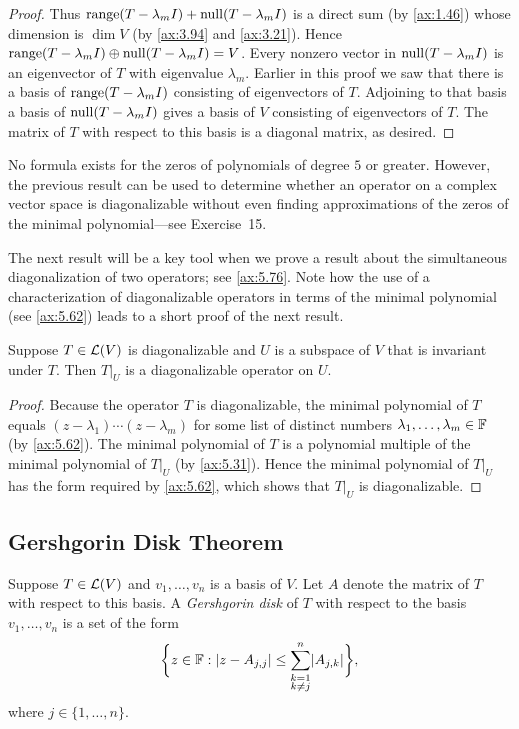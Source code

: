 \begin{proof}
Thus $\operatorname{range}(T-\lambda_mI)+\operatorname{null}(T-\lambda_mI)$ is a direct sum (by
\ref{ax:1.46}) whose dimension is $\dim V$ (by \ref{ax:3.94} and \ref{ax:3.21}).
Hence $\operatorname{range}(T-\lambda_mI)\oplus\operatorname{null}(T-\lambda_mI)=V$. Every nonzero vector in
$\operatorname{null}(T-\lambda_mI)$ is an eigenvector of $T$ with eigenvalue $\lambda_m$.
Earlier in this proof we saw that there is a basis of $\operatorname{range}(T-\lambda_mI)$
consisting of eigenvectors of $T$. Adjoining to that basis a basis of
$\operatorname{null}(T-\lambda_mI)$ gives a basis of $V$ consisting of eigenvectors of $T$. The
matrix of $T$ with respect to this basis is a diagonal matrix, as desired.
\end{proof}

No formula exists for the zeros of polynomials of degree $5$ or greater.
However, the previous result can be used to determine whether an operator on a
complex vector space is diagonalizable without even finding approximations of the
zeros of the minimal polynomial---see Exercise~15.

The next result will be a key tool when we prove a result about the simultaneous
diagonalization of two operators; see \ref{ax:5.76}. Note how the use of a
characterization of diagonalizable operators in terms of the minimal polynomial
(see \ref{ax:5.62}) leads to a short proof of the next result.

\begin{result}%
\label{ax:5.65}
Suppose $T\in\mathcal{L}(V)$ is diagonalizable and $U$ is a subspace of $V$ that is
invariant under $T$. Then $T|_U$ is a diagonalizable operator on $U$.
\end{result}

\begin{proof}
Because the operator $T$ is diagonalizable, the minimal polynomial of $T$ equals
$(z-\lambda_1)\cdots(z-\lambda_m)$ for some list of distinct numbers
$\lambda_1,\dots,\lambda_m\in\mathbb{F}$ (by \ref{ax:5.62}). The minimal polynomial of
$T$ is a polynomial multiple of the minimal polynomial of $T|_U$ (by
\ref{ax:5.31}). Hence the minimal polynomial of $T|_U$ has the form required by
\ref{ax:5.62}, which shows that $T|_U$ is diagonalizable.
\end{proof}

\subsection{Gershgorin Disk Theorem}

\begin{definition}\label{ax:5.66}
Suppose $T\in\mathcal{L}(V)$ and $v_1,\dots,v_n$ is a basis of $V$. Let $A$ denote the
matrix of $T$ with respect to this basis. A \emph{Gershgorin disk} of $T$ with
respect to the basis $v_1,\dots,v_n$ is a set of the form
\[ \biggl\{z\in\mathbb{F} : \lvert z-A_{j,j} \rvert\le\sum_{\substack{k=1\\k\ne j}}^n
   \lvert A_{j,k} \rvert\biggr\}, \]
where $j\in\{1,\dots,n\}$.
\end{definition}


